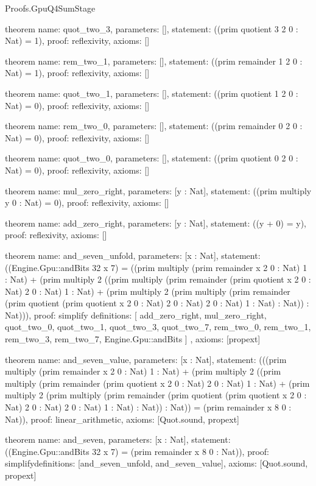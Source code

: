 \begin{lexlean}{Proofs.GpuQ4SumStage}
\begin{semanticmodule}
theorem{
  name: quot_two_3,
  parameters: [],
  statement: ((prim quotient 3 2 0 : Nat) = 1),
  proof: reflexivity{},
  axioms: []
}

theorem{
  name: rem_two_1,
  parameters: [],
  statement: ((prim remainder 1 2 0 : Nat) = 1),
  proof: reflexivity{},
  axioms: []
}

theorem{
  name: quot_two_1,
  parameters: [],
  statement: ((prim quotient 1 2 0 : Nat) = 0),
  proof: reflexivity{},
  axioms: []
}

theorem{
  name: rem_two_0,
  parameters: [],
  statement: ((prim remainder 0 2 0 : Nat) = 0),
  proof: reflexivity{},
  axioms: []
}

theorem{
  name: quot_two_0,
  parameters: [],
  statement: ((prim quotient 0 2 0 : Nat) = 0),
  proof: reflexivity{},
  axioms: []
}

theorem{
  name: mul_zero_right,
  parameters: [y : Nat],
  statement: ((prim multiply y 0 : Nat) = 0),
  proof: reflexivity{},
  axioms: []
}

theorem{
  name: add_zero_right,
  parameters: [y : Nat],
  statement: ((y + 0) = y),
  proof: reflexivity{},
  axioms: []
}

theorem{
  name: and_seven_unfold,
  parameters: [x : Nat],
  statement: ((Engine.Gpu::andBits 32 x 7) = ((prim multiply (prim remainder x 2 0 : Nat) 1 : Nat) + (prim multiply 2 ((prim multiply (prim remainder (prim quotient x 2 0 : Nat) 2 0 : Nat) 1 : Nat) + (prim multiply 2 (prim multiply (prim remainder (prim quotient (prim quotient x 2 0 : Nat) 2 0 : Nat) 2 0 : Nat) 1 : Nat) : Nat)) : Nat))),
  proof: simplify{
    definitions: [
      add_zero_right,
      mul_zero_right,
      quot_two_0,
      quot_two_1,
      quot_two_3,
      quot_two_7,
      rem_two_0,
      rem_two_1,
      rem_two_3,
      rem_two_7,
      Engine.Gpu::andBits
    ]
  },
  axioms: [propext]
}

theorem{
  name: and_seven_value,
  parameters: [x : Nat],
  statement: (((prim multiply (prim remainder x 2 0 : Nat) 1 : Nat) + (prim multiply 2 ((prim multiply (prim remainder (prim quotient x 2 0 : Nat) 2 0 : Nat) 1 : Nat) + (prim multiply 2 (prim multiply (prim remainder (prim quotient (prim quotient x 2 0 : Nat) 2 0 : Nat) 2 0 : Nat) 1 : Nat) : Nat)) : Nat)) = (prim remainder x 8 0 : Nat)),
  proof: linear_arithmetic{},
  axioms: [Quot.sound, propext]
}

theorem{
  name: and_seven,
  parameters: [x : Nat],
  statement: ((Engine.Gpu::andBits 32 x 7) = (prim remainder x 8 0 : Nat)),
  proof: simplify{definitions: [and_seven_unfold, and_seven_value]},
  axioms: [Quot.sound, propext]
}


\end{semanticmodule}
\end{lexlean}
